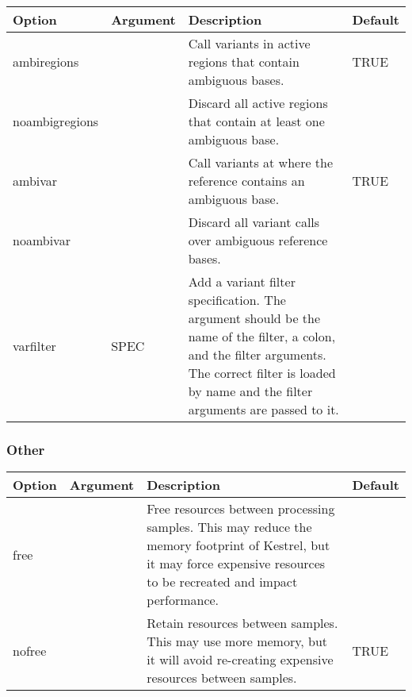 \begin{small}
	\begin{longtable}{|p{\optwidth}|p{\argwidth}|p{\dscwidth}|p{}|}
		\hline
		
		\textbf{Option} & \textbf{Argument} & \textbf{Description} & \textbf{Default} \\ \hline
		
		\ddash{}ambiregions  & &
		Call variants in active regions that contain ambiguous bases.
		& TRUE
		\\ \hline
		
		\ddash{}noambigregions & &
		Discard all active regions that contain at least one ambiguous base.
		&
		\\ \hline
		
		\ddash{}ambivar & &
		Call variants at where the reference contains an ambiguous base.
		& TRUE
		\\ \hline
		
		\ddash{}noambivar & &
		Discard all variant calls over ambiguous reference bases.
		&
		\\ \hline
		
		\ddash{}varfilter & SPEC &
		Add a variant filter specification. The argument should be the name of the filter, a colon, and the filter arguments. The correct filter is loaded by name and the filter arguments are passed to it.
		&
		\\ \hline

	\end{longtable}
\end{small}



\subsubsection{Other}
\label{sec.cmdline.opts.other}
\begin{small}
	\begin{longtable}{|p{\optwidth}|p{\argwidth}|p{\dscwidth}|p{}|}
		\hline
		
		\textbf{Option} & \textbf{Argument} & \textbf{Description} & \textbf{Default} \\ \hline
		
		\ddash{}free & &
		Free resources between processing samples. This may reduce the memory footprint of Kestrel, but it may force expensive resources to be recreated and impact performance.
		&
		\\ \hline
		
		\ddash{}nofree & &
		Retain resources between samples. This may use more memory, but it will avoid re-creating expensive resources between samples.
		& TRUE
		\\ \hline
		
	\end{longtable}
\end{small}
